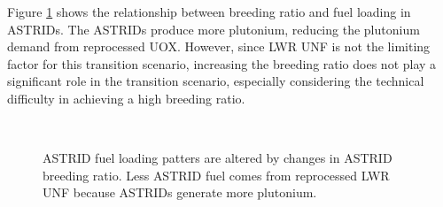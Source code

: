 Figure \ref{fig:br_fuel} shows the relationship between breeding ratio and fuel loading in \glspl{ASTRID}.
The \glspl{ASTRID} produce 
more plutonium, reducing the plutonium demand from 
reprocessed \gls{UOX}. However, since \gls{LWR} \gls{UNF} is not
the limiting factor for this transition scenario,
increasing the breeding ratio does not play a significant
role in the transition scenario, especially considering the technical difficulty
in achieving a high breeding ratio.

\begin{figure}[!ht]
	\centering
	\quad
	\\
	\quad
	\caption{\gls{ASTRID} fuel loading patters are altered by changes in \gls{ASTRID} 
		breeding ratio. Less \gls{ASTRID} fuel comes from reprocessed \gls{LWR} \gls{UNF}
		because \glspl{ASTRID} generate more plutonium.}
	\label{fig:br_fuel}
\end{figure}

